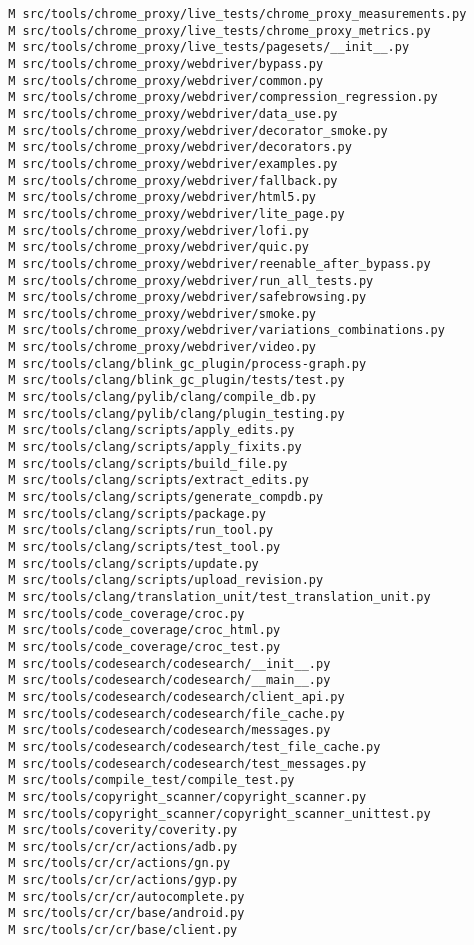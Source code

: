 \documentclass{article}
\begin{document}
\begin{verbatim}
 M src/tools/chrome_proxy/live_tests/chrome_proxy_measurements.py
 M src/tools/chrome_proxy/live_tests/chrome_proxy_metrics.py
 M src/tools/chrome_proxy/live_tests/pagesets/__init__.py
 M src/tools/chrome_proxy/webdriver/bypass.py
 M src/tools/chrome_proxy/webdriver/common.py
 M src/tools/chrome_proxy/webdriver/compression_regression.py
 M src/tools/chrome_proxy/webdriver/data_use.py
 M src/tools/chrome_proxy/webdriver/decorator_smoke.py
 M src/tools/chrome_proxy/webdriver/decorators.py
 M src/tools/chrome_proxy/webdriver/examples.py
 M src/tools/chrome_proxy/webdriver/fallback.py
 M src/tools/chrome_proxy/webdriver/html5.py
 M src/tools/chrome_proxy/webdriver/lite_page.py
 M src/tools/chrome_proxy/webdriver/lofi.py
 M src/tools/chrome_proxy/webdriver/quic.py
 M src/tools/chrome_proxy/webdriver/reenable_after_bypass.py
 M src/tools/chrome_proxy/webdriver/run_all_tests.py
 M src/tools/chrome_proxy/webdriver/safebrowsing.py
 M src/tools/chrome_proxy/webdriver/smoke.py
 M src/tools/chrome_proxy/webdriver/variations_combinations.py
 M src/tools/chrome_proxy/webdriver/video.py
 M src/tools/clang/blink_gc_plugin/process-graph.py
 M src/tools/clang/blink_gc_plugin/tests/test.py
 M src/tools/clang/pylib/clang/compile_db.py
 M src/tools/clang/pylib/clang/plugin_testing.py
 M src/tools/clang/scripts/apply_edits.py
 M src/tools/clang/scripts/apply_fixits.py
 M src/tools/clang/scripts/build_file.py
 M src/tools/clang/scripts/extract_edits.py
 M src/tools/clang/scripts/generate_compdb.py
 M src/tools/clang/scripts/package.py
 M src/tools/clang/scripts/run_tool.py
 M src/tools/clang/scripts/test_tool.py
 M src/tools/clang/scripts/update.py
 M src/tools/clang/scripts/upload_revision.py
 M src/tools/clang/translation_unit/test_translation_unit.py
 M src/tools/code_coverage/croc.py
 M src/tools/code_coverage/croc_html.py
 M src/tools/code_coverage/croc_test.py
 M src/tools/codesearch/codesearch/__init__.py
 M src/tools/codesearch/codesearch/__main__.py
 M src/tools/codesearch/codesearch/client_api.py
 M src/tools/codesearch/codesearch/file_cache.py
 M src/tools/codesearch/codesearch/messages.py
 M src/tools/codesearch/codesearch/test_file_cache.py
 M src/tools/codesearch/codesearch/test_messages.py
 M src/tools/compile_test/compile_test.py
 M src/tools/copyright_scanner/copyright_scanner.py
 M src/tools/copyright_scanner/copyright_scanner_unittest.py
 M src/tools/coverity/coverity.py
 M src/tools/cr/cr/actions/adb.py
 M src/tools/cr/cr/actions/gn.py
 M src/tools/cr/cr/actions/gyp.py
 M src/tools/cr/cr/autocomplete.py
 M src/tools/cr/cr/base/android.py
 M src/tools/cr/cr/base/client.py

\end{verbatim}
\end{document}

